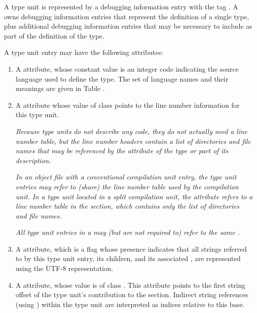 A type unit is represented by a debugging information entry
with the tag \DWTAGtypeunitTARG. 
A  owns debugging
information entries that represent the definition of a single
type, plus additional debugging information entries that may
be necessary to include as part of the definition of the type.

A type unit entry may have the following attributes:
\begin{enumerate}[1. ]

\item A 
\DWATlanguage{} attribute, 
whose
constant value is an integer code indicating the source
language used to define the type. The set of language names
and their meanings are given in Table .

\item A \DWATstmtlist{} attribute
whose value of class \CLASSlineptr{} points to the line number 
information for this type unit.

\textit{Because type units do not describe any code, they
do not actually need a line number table, but the line number
headers contain a list of directories and file names that
may be referenced by the \DWATdeclfile{} attribute of the
type or part of its description.} 

\textit{In an object file with a conventional compilation 
unit entry, the type unit entries may refer to (share) the 
line number table used by the compilation unit. In a type 
unit located in a split compilation unit, the 
\DWATstmtlistNAME{} attribute refers to a 
line number table in the \dotdebuglinedwo{} section, which
contains only the list of directories and file names.}

\textit{All type unit entries in a \splitDWARFobjectfile{} may 
(but are not required to) refer to the same 
.}

\item A \DWATuseUTFeight{} attribute, which is a flag
whose presence indicates that all strings referred to by this type
unit entry, its children, and its associated 
, 
are represented using the UTF-8 representation.

\item A 
\DWATstroffsetsbase{}
attribute, whose value is of class \CLASSstroffsetsptr. 
This attribute points
to the first string offset of the type unit's contribution to
the \dotdebugstroffsets{} section. Indirect string references
(using \DWFORMstrx) within the type unit are interpreted
as indices relative to this base.

\end{enumerate}

